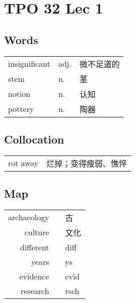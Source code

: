 \section{TPO 32 Lec 1}

\subsection{Words}

\begin{tabular}{lll}
    insignificant & adj. & 微不足道的 \\
    stem          & n.   & 茎     \\
    notion        & n.   & 认知    \\
    pottery       & n.   & 陶器    \\
\end{tabular}

\subsection{Collocation}

\begin{tabular}{ll}
    rot away & 烂掉；变得瘦弱、憔悴 \\
\end{tabular}

\subsection{Map}

\begin{tabular}{rc@{\quad$\to$\quad}l}
    archaeology &  & 古    \\
    culture     &  & 文化   \\
    different   &  & diff \\
    years       &  & ys   \\
    evidence    &  & evid \\
    research    &  & rsch \\
\end{tabular}

\newpage
